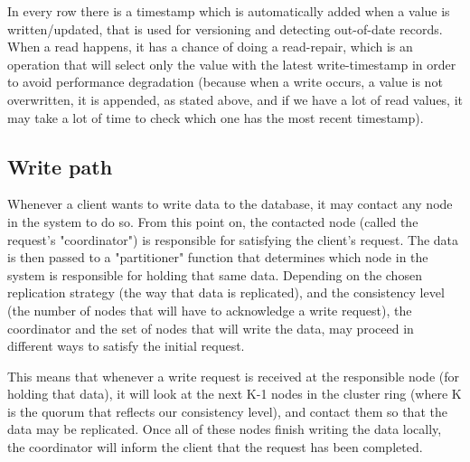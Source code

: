 \documentclass[runningheads]{llncs}
\begin{document}
In every row there is a timestamp which is automatically added when a value is written/updated, that is used for versioning and detecting out-of-date records. When a read happens, it has a chance of doing a read-repair, which is an operation that will select only the value with the latest write-timestamp in order to avoid performance degradation (because when a write occurs, a value is not overwritten, it is appended, as stated above, and if we have a lot of read values, it may take a lot of time to check which one has the most recent timestamp).\par

\subsection{Write path}
Whenever a client wants to write data to the database, it may contact any node in the system to do so. From this point on, the contacted node (called the request's "coordinator") is responsible for satisfying the client's request.
The data is then passed to a "partitioner" function that determines which node in the system is responsible for holding that same data. Depending on the chosen replication strategy (the way that data is replicated), and the consistency level (the number of nodes that will have to acknowledge a write request), the coordinator and the set of nodes that will write the data, may proceed in different ways to satisfy the initial request.

This means that whenever a write request is received at the responsible node (for holding that data), it will look at the next K-1 nodes in the cluster ring (where K is the quorum that reflects our consistency level), and contact them so that the data may be replicated. Once all of these nodes finish writing the data locally, the coordinator will inform the client that the request has been completed.
\end{document}
